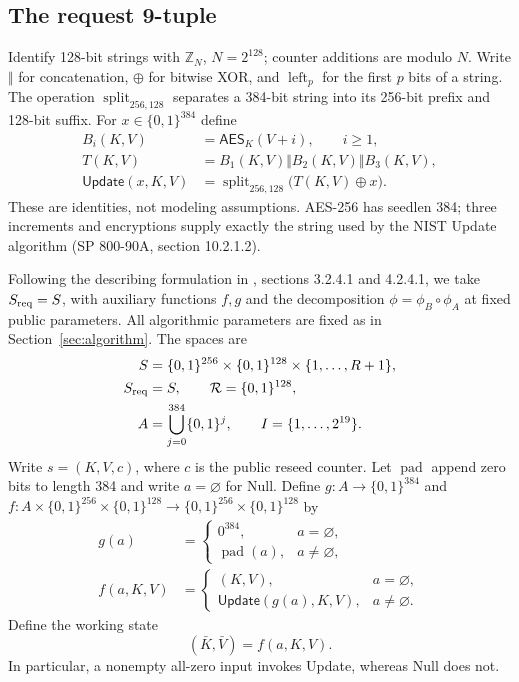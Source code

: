 \documentclass[journal=tosc,preprint,floatrow,nohyperxmp]{iacrtrans}
\numberwithin{lemma}{section}
\numberwithin{proposition}{section}
\newcommand{\bits}{\{0,1\}}
\newcommand{\Enc}{\mathsf{AES}}
\newcommand{\Upd}{\ensuremath{\mathsf{Update}}}
\newcommand{\pad}{\operatorname{pad}}
\numberwithin{equation}{section}
\theoremstyle{definition}
\numberwithin{definition}{section}
\theoremstyle{plain}
\begin{document}
\subsection{The request 9-tuple}
Identify 128-bit strings with $\mathbb Z_N$, $N=2^{128}$; counter additions are modulo $N$. Write $\Vert$ for concatenation, $\oplus$ for bitwise XOR, and $\operatorname{left}_p$ for the first $p$ bits of a string. The operation $\operatorname{split}_{256,128}$ separates a 384-bit string into its 256-bit prefix and 128-bit suffix. For $x\in\bits^{384}$ define
\begin{align}
 B_i(K,V)&=\Enc_K(V+i),\qquad i\ge1,\label{eq:block}\\
 T(K,V)&=B_1(K,V)\Vert B_2(K,V)\Vert B_3(K,V),\label{eq:triple}\\
 \Upd(x,K,V)&=\operatorname{split}_{256,128}\bigl(T(K,V)\oplus x\bigr).\label{eq:update}
\end{align}
These are identities, not modeling assumptions. AES-256 has seedlen 384; three increments and encryptions supply exactly the string used by the NIST Update algorithm (SP 800-90A, section 10.2.1.2).

Following the describing formulation in \cite{browser}, sections 3.2.4.1 and 4.2.4.1, we take $S_{\rm req}=S$, with auxiliary functions $f,g$ and the decomposition $\phi=\phi_B\circ\phi_A$ at fixed public parameters. All algorithmic parameters are fixed as in Section~\ref{sec:algorithm}. The spaces are
\begin{align*}
 S&=\bits^{256}\times\bits^{128}\times\{1,\ldots,R+1\},\\
 S_{\rm req}&=S,\qquad \mathcal R=\bits^{128},\\
 A&=\bigcup_{j=0}^{384}\bits^j,\qquad I=\{1,\ldots,2^{19}\}.
\end{align*}
Write $s=(K,V,c)$, where $c$ is the public reseed counter. Let $\pad$ append zero bits to length 384 and write $a=\varnothing$ for Null. Define $g:A\to\bits^{384}$ and $f:A\times\bits^{256}\times\bits^{128}\to\bits^{256}\times\bits^{128}$ by
\begin{align}
 g(a)&=\begin{cases}0^{384},&a=\varnothing,\\\pad(a),&a\ne\varnothing,\end{cases}\label{eq:g}\\
 f(a,K,V)&=\begin{cases}(K,V),&a=\varnothing,\\
 \Upd(g(a),K,V),&a\ne\varnothing.\end{cases}\label{eq:f}
\end{align}
Define the working state
\begin{equation}
 (\bar K,\bar V)=f(a,K,V).\label{eq:pre}
\end{equation} In particular, a nonempty all-zero input invokes Update, whereas Null does not.
\end{document}
